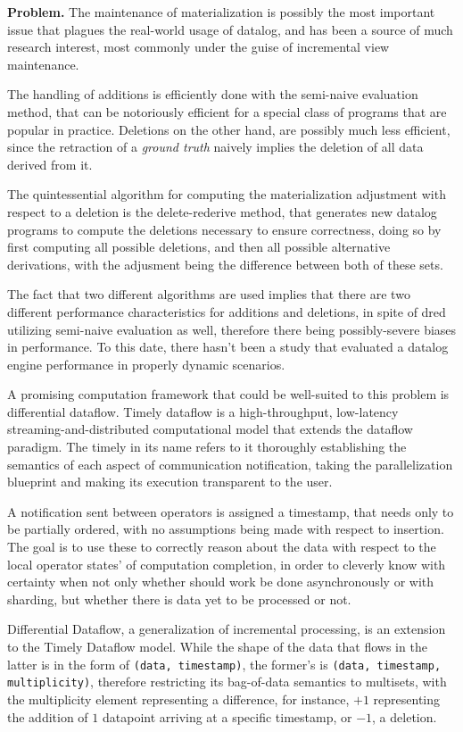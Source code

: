 \documentclass[manuscript,screen,review]{acmart}
\theoremstyle{definition}
\begin{document}
\textbf{Problem.} The maintenance of materialization is possibly the most important issue
that plagues the real-world usage of datalog, and has been a source of much research interest,
most commonly under the guise of incremental view maintenance.

The handling of additions is efficiently done with the semi-naive evaluation method\cite{datalog},
that can be notoriously efficient for a special class of programs that are popular in practice.
Deletions on the other hand, are possibly much less efficient, since the retraction of a \textit{ground truth}
naively implies the deletion of all data derived from it.

The quintessential algorithm for computing the materialization adjustment with respect to a
deletion is the delete-rederive\cite{dred} method, that generates new datalog programs to
compute the deletions necessary to ensure correctness, doing so by first computing all possible
deletions, and then all possible alternative derivations, with the adjusment being the difference
between both of these sets.

The fact that two different algorithms are used implies that there are two different performance
characteristics for additions and deletions, in spite of dred utilizing semi-naive evaluation as well,
therefore there being possibly-severe biases in performance. To this date, there hasn't been
a study that evaluated a datalog engine performance in properly dynamic scenarios.

A promising computation framework that could be well-suited to this problem is differential
dataflow\cite{differential_dataflow}. Timely dataflow is a high-throughput, low-latency
streaming-and-distributed computational model that extends the dataflow paradigm. The timely
in its name refers to it thoroughly establishing the semantics of each aspect of communication
notification, taking the parallelization blueprint and making its execution transparent to the user.

A notification sent between operators is assigned a timestamp, that needs only to be partially
ordered, with no assumptions being made with respect to insertion. The goal is to use these to
correctly reason about the data with respect to the local operator states' of computation completion,
in order to cleverly know with certainty when not only whether should work be done asynchronously
or with sharding, but whether there is data yet to be processed or not.

Differential Dataflow, a generalization of incremental processing, is an extension to the
Timely Dataflow model. While the shape of the data that flows in the latter is in the form
of \verb|(data, timestamp)|, the former's is \verb|(data, timestamp, multiplicity)|, therefore
restricting its bag-of-data semantics to multisets, with the multiplicity element representing a
difference, for instance, $+1$ representing the addition of $1$ datapoint arriving at a
specific timestamp, or $-1$, a deletion.
\end{document}
